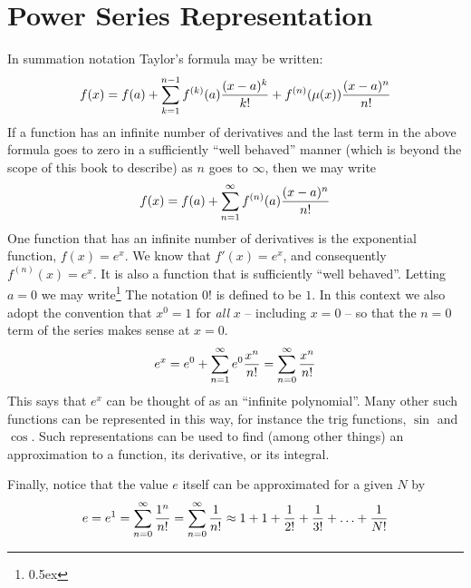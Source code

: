\section{Power Series Representation}
In summation notation Taylor's formula may be written:
$$
f(x) = f(a) + \sum_{k=1}^{n-1} f^{(k)}(a) {(x-a)^k \over k!} + f^{(n)}(\mu(x)) {(x-a)^n \over n!}
$$
If a function has an infinite number of derivatives and the last term in the above formula
goes to zero in a sufficiently ``well behaved''  
manner (which is beyond the scope of this book to describe) as $n$ goes to $\infty$, then we may write
$$
f(x) = f(a) + \sum_{n=1}^\infty f^{(n)}(a) {(x-a)^n \over n!}
$$
One function that has an infinite number of derivatives is the exponential function, $f(x) = e^x$.
We know that $f'(x) = e^x$, and consequently $f^{(n)}(x) = e^x$. It is also a function that 
is sufficiently ``well behaved''. Letting $a=0$ we may write\footnote{{\kern 0.5pt \raise 0.5ex \hbox{\ddag}}}%
{The notation $0!$ is defined to be $1$. In this context we also adopt the convention that $x^0 = 1$ for {\it all\/} $x$ -- including $x = 0$ -- so that the $n=0$ term of the series makes sense at $x = 0$.}
$$
e^x = e^0 + \sum_{n=1}^\infty e^0 {x^n \over n!} = \sum_{n=0}^\infty {x^n \over n!}
$$
This says that $e^x$ can be thought of as an ``infinite polynomial''. Many other such functions can
be represented in this way, for instance the trig functions, $\sin$ and $\cos$.
Such representations can be used to find (among other things) an approximation to a function, its derivative, or its integral.

Finally, notice that the value $e$ itself can be approximated for a given $N$ by
$$
e = e^1 = \sum_{n=0}^\infty {1^n \over n!}  = \sum_{n=0}^\infty {1 \over n!} \approx 1 + 1 + {1 \over 2!} + {1 \over 3!} + \ldots + {1 \over N!}
$$


